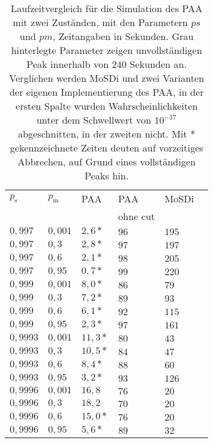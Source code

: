 \begin{table}[h]
\centering
\caption[Laufzeitvergleich für die Simulation des PAA mit zwei Zuständen]{Laufzeitvergleich für die Simulation des PAA mit zwei Zuständen, mit den Parametern $ps$ und $pm$, Zeitangaben in Sekunden. Grau hinterlegte Parameter zeigen unvollständigen Peak innerhalb von $240$ Sekunden an. Verglichen werden MoSDi und zwei Varianten der eigenen Implementierung des PAA, in der ersten Spalte wurden Wahrscheinlichkeiten unter dem Schwellwert von $10^{-17}$ abgeschnitten, in der zweiten nicht. Mit $*$ gekennzeichnete Zeiten deuten auf vorzeitiges Abbrechen, auf Grund eines vollständigen Peaks hin.}
\label{2s_laufzeit_paa}
\begin{tabular}{|l|l||l|l|l|l|} \hline
$p_\text{s}$ & $p_\text{m}$  & PAA & PAA & MoSDi \\
& & & ohne cut & \\  \hline \hline
$0,997  $ & $ 0,001$ & $2,6*  $ & $96 $ & $ 195$ \\ \hline
$0,997  $ & $ 0,3  $ & $2,8*  $ & $97 $ & $ 197 $ \\ \hline
$0,997  $ & $ 0,6  $ & $2,1*  $ & $98 $ & $ 205 $ \\ \hline
$0,997  $ & $ 0,95 $ & $0,7*  $ & $99 $ & $ 220$ \\ \hline
$0,999  $ & $ 0,001$ & $8,0*  $ & $86 $ & $ 79$ \\ \hline
$0,999  $ & $ 0,3  $ & $7,2*  $ & $89 $ & $ 93$ \\ \hline
$0,999  $ & $ 0,6  $ & $6,1*  $ & $92 $ & $ 115$ \\ \hline
$0,999  $ & $ 0,95 $ & $2,3*  $ & $97 $ & $ 161$ \\ \hline
$0,9993 $ & $ 0,001$ & $11,3* $ & $80 $ & $ 43$ \\ \hline
$0,9993 $ & $ 0,3  $ & $10,5* $ & $84 $ & $ 47$ \\ \hline
$0,9993 $ & $ 0,6  $ & $8,4*  $ & $88 $ & $ 60$ \\ \hline
$0,9993 $ & $ 0,95 $ & $3,2*  $ & $93 $ & $ 126$ \\ \hline
\cellcolor{gray!25}$0,9996 $ &\cellcolor{gray!25} $ 0,001$ & $16,8 $ & $76 $ & $ 20$ \\ \hline
$0,9996 $ & $ 0,3  $ & $18,2 $ & $70 $ & $ 20$ \\ \hline
$0,9996 $ & $ 0,6  $ & $15,0* $ & $76 $ & $ 20$ \\ \hline
$0,9996 $ & $ 0,95 $ & $5,6*  $ & $89 $ & $ 32$ \\ \hline
\end{tabular}
\end{table}


